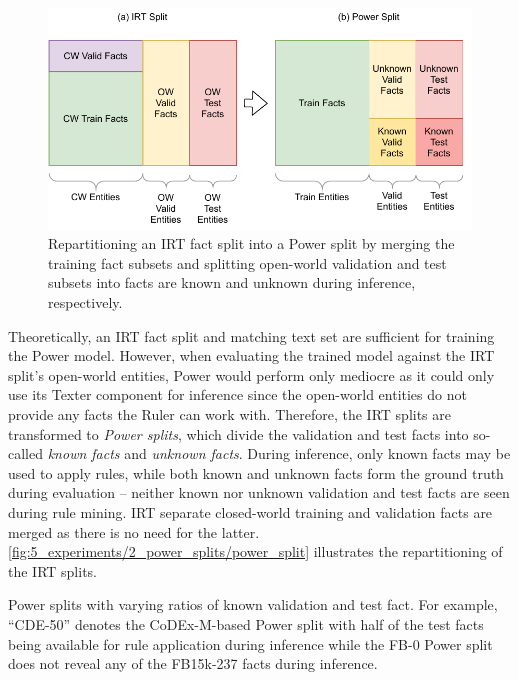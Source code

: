 \begin{figure}[t]
    \centering
    \includegraphics[width=\textwidth]{5_experiments/2_power_splits/power_split}
    \caption{Repartitioning an IRT fact split into a Power split by merging the training fact subsets and splitting open-world validation and test subsets into facts are known and unknown during inference, respectively.}
    \label{fig:5_experiments/2_power_splits/power_split}
\end{figure}

Theoretically, an IRT fact split and matching text set are sufficient for training the Power model. However, when evaluating the trained model against the IRT split's open-world entities, Power would perform only mediocre as it could only use its Texter component for inference since the open-world entities do not provide any facts the Ruler can work with. Therefore, the IRT splits are transformed to \emph{Power splits}, which divide the validation and test facts into so-called \emph{known facts} and \emph{unknown facts}. During inference, only known facts may be used to apply rules, while both known and unknown facts form the ground truth during evaluation -- neither known nor unknown validation and test facts are seen during rule mining. IRT separate closed-world training and validation facts are merged as there is no need for the latter. \autoref{fig:5_experiments/2_power_splits/power_split} illustrates the repartitioning of the IRT splits.

\begin{table}[t]
    \makebox[\textwidth][c]{
        
    }
    \caption{Power splits with varying ratios of known validation and test fact. For example, ``CDE-50'' denotes the CoDEx-M-based Power split with half of the test facts being available for rule application during inference while the FB-0 Power split does not reveal any of the FB15k-237 facts during inference.}
    \label{tab:5_experiments/2_power_splits/power_splits_table}
\end{table}

